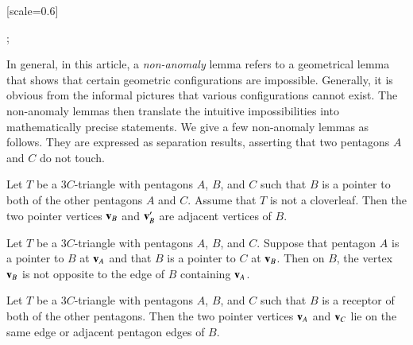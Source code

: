 {
[scale=0.6]
\begin{scope}[xshift=4cm]
;
\end{scope}
}

In general, in this article, a {\it non-anomaly} lemma refers to a
geometrical lemma that shows that certain geometric configurations are
impossible.  Generally, it is obvious from the informal pictures that
various configurations cannot exist.  The non-anomaly lemmas then
translate the intuitive impossibilities into mathematically precise
statements.  We give a few non-anomaly lemmas as follows.
They are expressed as separation results, asserting that
two pentagons $A$ and $C$ do not touch.

\begin{lemma} 
Let $T$ be a $3C$-triangle with pentagons $A$, $B$, and $C$ such that
$B$ is a pointer to both of the other pentagons $A$ and $C$.  
Assume that $T$ is not a cloverleaf.
Then the two pointer vertices ${\mathbf v}_B$ and ${\mathbf v}_B'$ are adjacent
vertices of $B$.
\end{lemma}

\begin{lemma}  
Let $T$ be a $3C$-triangle with pentagons $A$, $B$, and $C$.
Suppose that pentagon
$A$ is a pointer to $B$ at ${\mathbf v}_A$ and that $B$ is a pointer to $C$
at ${\mathbf v}_B$.  Then on $B$, the vertex
${\mathbf v}_B$ is not opposite to the edge of $B$ containing
${\mathbf v}_A$.
\end{lemma}

\begin{lemma} 
  Let $T$ be a $3C$-triangle with pentagons $A$, $B$, and $C$ such
  that $B$ is a receptor of both of the other pentagons.  Then the two
  pointer vertices ${\mathbf v}_A$ and ${\mathbf v}_C$ lie on the same edge or adjacent
  pentagon edges of $B$.
\end{lemma}





